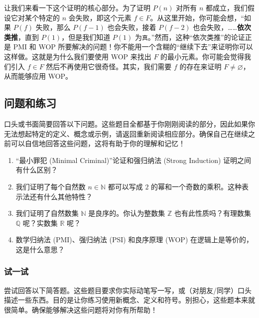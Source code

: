 让我们来看一下这个证明的核心部分。为了证明 $P(n)$ 对所有 $n$ 都成立，我们假设它对某个特定的 $n$ 会失败，即这个元素 $f \in F$。从这里开始，你可能会想，``如果 $P(f)$ 失败，那么 $P(f-1)$ 也会失败，接着 $P(f-2)$ 也会失败，……\textbf{依次类推}，直到 $P(1)$，但是我们知道 $P(1)$ 为\verb|真|。''然而，这种``依次类推''的论证正是 PMI 和 WOP 所要解决的问题！你不能用一个含糊的``继续下去''来证明你可以这样做。这就是为什么我们要使用 WOP 来找出 $F$ 的最小元素。你可能会觉得我们引入 $f \in F$ 然后不再使用它很奇怪。其实，我们需要 $f$ 的存在来证明 $F \ne \varnothing$，从而能够应用 WOP。

\subsection{问题和练习}

口头或书面简要回答以下问题。这些题目全都基于你刚刚阅读的部分，因此如果你无法想起特定的定义、概念或示例，请返回重新阅读相应部分。确保自己在继续之前可以自信地回答这些问题，这将有助于你的理解和记忆！

\begin{enumerate}[label=(\arabic*)]
    \item ``最小罪犯 (Minimal Criminal)''论证和强归纳法 (Strong Induction) 证明之间有什么区别？
    \item 我们证明了每个自然数 $n \in \mathbb{N}$ 都可以写成 $2$ 的幂和一个奇数的乘积。这种表示法还有什么其他特性？
    \item 我们证明了自然数集 $\mathbb{N}$ 是良序的。你认为整数集 $\mathbb{Z}$ 也有此性质吗？有理数集 $\mathbb{Q}$ 呢？实数集 $\mathbb{R}$ 呢？
    \item 数学归纳法 (PMI)、强归纳法 (PSI) 和良序原理 (WOP) 在逻辑上是等价的，这是什么意思？
\end{enumerate}

\subsubsection*{试一试}

尝试回答以下简答题。这些题目要求你实际动笔写一写，或（对朋友/同学）口头描述一些东西。目的是让你练习使用新概念、定义和符号。别担心，这些题本来就很简单。确保能够解决这些问题将对你有所帮助！

